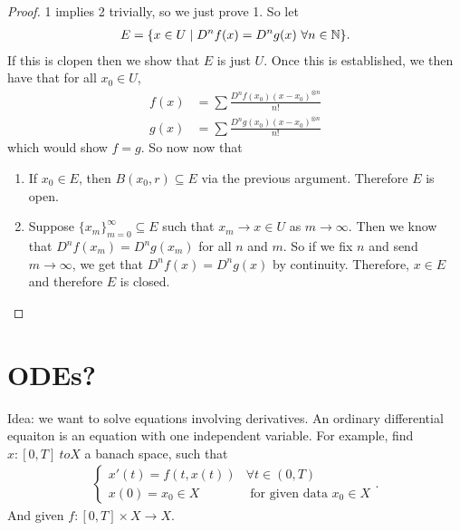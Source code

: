 \documentclass{report}
\begin{document}
\begin{proof}
    1 implies 2 trivially, so we just prove 1. So let 
    \begin{align*}
        E = \{x \in U \mid D^nf(x) = D^ng(x) \,\, \forall n\in \NN\}.
    \end{align*}
    If this is clopen then we show that $E$ is just $U$. Once this is established, we then have that for all $x_0 \in U$,
    \begin{align*}
        f(x) &= \sum \frac{D^n f(x_0)(x-x_0)^{\otimes n}}{n!} \\
        g(x) &= \sum \frac{D^n g(x_0)(x-x_0)^{\otimes n}}{n!}
     \end{align*}
     which would show $f=g$. So now now that 
     \begin{enumerate}
        \item If $x_0 \in E$, then $B(x_0, r) \subseteq E$ via the previous argument. Therefore $E$ is open.
        \item Suppose $\{x_m\}_{m=0}^\infty \subseteq E$ such that $x_m \to x \in U$ as $m \to \infty$. Then we know that $D^n f(x_m) = D^n g(x_m)$ for all $n$ and $m$. So if we fix $n$ and send $m \to \infty$, we get that $D^n f(x) = D^n g(x)$ by continuity. Therefore, $x \in E$ and therefore $E$ is closed.
     \end{enumerate}
\end{proof}

\chapter{ODEs?}
\noindent Idea: we want to solve equations involving derivatives. An ordinary differential equaiton is an equation with one independent variable. For example, find $x: [0, T] \ to X$ a banach space, such that 
\begin{align*}
    \begin{cases}
        x'(t) = f(t, x(t)) & \forall t \in (0, T)\\
        x(0) = x_0 \in X & \text{ for given data $x_0 \in X$}
    \end{cases}.
\end{align*}
And given $f: [0, T] \times X \to X$. 
\end{document}
